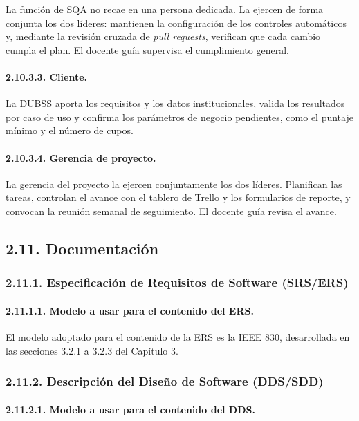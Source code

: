 La función de SQA no recae en una persona dedicada. La ejercen de forma conjunta los dos líderes: mantienen la configuración de los controles automáticos y, mediante la revisión cruzada de \textit{pull requests}, verifican que cada cambio cumpla el plan. El docente guía supervisa el cumplimiento general.

\paragraph{2.10.3.3. Cliente.}

La DUBSS aporta los requisitos y los datos institucionales, valida los resultados por caso de uso y confirma los parámetros de negocio pendientes, como el puntaje mínimo y el número de cupos.

\paragraph{2.10.3.4. Gerencia de proyecto.}

La gerencia del proyecto la ejercen conjuntamente los dos líderes. Planifican las tareas, controlan el avance con el tablero de Trello y los formularios de reporte, y convocan la reunión semanal de seguimiento. El docente guía revisa el avance.

\subsection{2.11. Documentación}

\subsubsection{2.11.1. Especificación de Requisitos de Software (SRS/ERS)}

\paragraph{2.11.1.1. Modelo a usar para el contenido del ERS.}

El modelo adoptado para el contenido de la ERS es la IEEE 830, desarrollada en las secciones 3.2.1 a 3.2.3 del Capítulo 3.

\subsubsection{2.11.2. Descripción del Diseño de Software (DDS/SDD)}

\paragraph{2.11.2.1. Modelo a usar para el contenido del DDS.}

